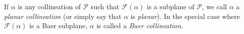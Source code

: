 If $\alpha$ is any collineation of $\mathcal{P}$ such that $\mathcal{F}(\alpha)$ is a subplane of $\mathcal{P}$, we call $\alpha$ a \emph{planar collineation} (or simply say that $\alpha$ is \emph{planar}). In the special case where $\mathcal{F}(\alpha)$ is a Baer subplane, $\alpha$ is called a \emph{Baer collineation}.
